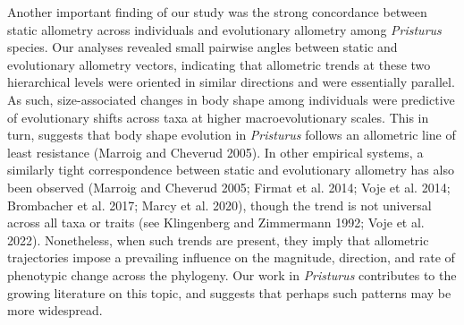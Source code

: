 \documentclass[
  11pt,
]{article}
\providecommand{\DIFaddtex}[1]{{\protect\color{blue}\uwave{#1}}} %
\providecommand{\DIFaddbegin}{} %
\providecommand{\DIFaddend}{} %
\providecommand{\DIFadd}[1]{\texorpdfstring{\DIFaddtex{#1}}{#1}} %
\newcommand{\DIFaddincludegraphics}[2][]{{\color{blue}\fbox{\DIFOincludegraphics[#1]{#2}}}} %
\DeclareRobustCommand{\DIFaddbegin}{\DIFOaddbegin \let\includegraphics\DIFaddincludegraphics} %
\DeclareRobustCommand{\DIFaddend}{\DIFOaddend \let\includegraphics\DIFOincludegraphics} %
\begin{document}
Another important finding of our study was the strong concordance
between static allometry across individuals and evolutionary allometry
among \emph{Pristurus} species. Our analyses revealed small pairwise
angles between static and evolutionary allometry vectors, indicating
that allometric trends at these two hierarchical levels were oriented in
similar directions and were essentially parallel. As such,
size-associated changes in \DIFaddbegin \textbf{\DIFadd{CHANGE}}\DIFaddend body shape among individuals
were predictive of evolutionary shifts across taxa at higher
macroevolutionary scales. This in turn, suggests that
\DIFaddbegin \textbf{\DIFadd{CHANGE}}\DIFaddend body shape evolution in \emph{Pristurus} follows an
allometric line of least resistance (Marroig and Cheverud 2005). In
other empirical systems, a similarly tight correspondence between static
and evolutionary allometry has also been observed (Marroig and Cheverud
2005; Firmat et al. 2014; Voje et al. 2014; Brombacher et al. 2017;
Marcy et al. 2020), though the trend is not universal across all taxa or
traits (see Klingenberg and Zimmermann 1992; Voje et al. 2022).
Nonetheless, when such trends are present, they imply that allometric
trajectories impose a prevailing influence on the magnitude, direction,
and rate of phenotypic change across the phylogeny. Our work in
\emph{Pristurus} contributes to the growing literature on this topic,
and suggests that perhaps such patterns may be more
widespread.\hfill\break
\end{document}
